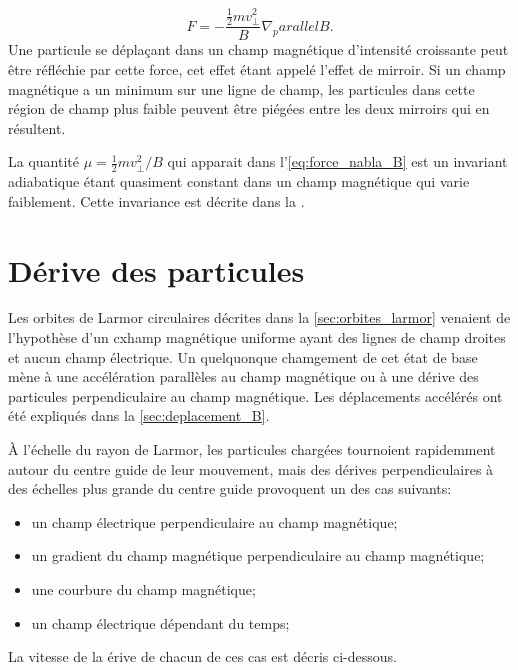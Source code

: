 \documentclass[main.tex]{subfiles}
\begin{document}
\begin{equation}
	F = - \frac{\frac{1}{2} m v_\perp^2}{B} \nabla_parallel B.
	\label{eq:force_nabla_B}
\end{equation}
Une particule se déplaçant dans un champ magnétique d'intensité croissante peut être réfléchie par cette force, cet effet étant appelé l'effet de mirroir.
Si un champ magnétique a un minimum sur une ligne de champ, les particules dans cette région de champ plus faible peuvent être piégées entre les deux mirroirs qui en résultent.

La quantité \( \mu = \frac{1}{2} m v_\perp^2 / B \) qui apparait dans l'\autoref{eq:force_nabla_B} est un invariant adiabatique étant quasiment constant dans un champ magnétique qui varie faiblement.
Cette invariance est décrite dans la \color{red}{Section 2.7 (lien à rajouter quand elle sera faite)}\color{black}.

\section{Dérive des particules}
\label{sec:derive_particule}

Les orbites de Larmor circulaires décrites dans la \autoref{sec:orbites_larmor} venaient de l'hypothèse d'un cxhamp magnétique uniforme ayant des lignes de champ droites et aucun champ électrique.
Un quelquonque chamgement de cet état de base mène à une accélération parallèles au champ magnétique ou à une dérive des particules perpendiculaire au champ magnétique.
Les déplacements accélérés ont été expliqués dans la \autoref{sec:deplacement_B}.

À l'échelle du rayon de Larmor, les particules chargées tournoient rapidemment autour du centre guide de leur mouvement, mais  des dérives perpendiculaires à des échelles plus grande du centre guide provoquent  un des cas suivants:

\begin{itemize}
	\item[ (1) ] un champ électrique perpendiculaire au champ magnétique;
	\item[ (2) ] un gradient du champ magnétique perpendiculaire au champ magnétique;
	\item[ (3) ] une courbure du champ magnétique;
	\item[ (4) ] un champ électrique dépendant du temps;
\end{itemize}

La vitesse de la érive de chacun de ces cas est décris ci-dessous.
\end{document}
